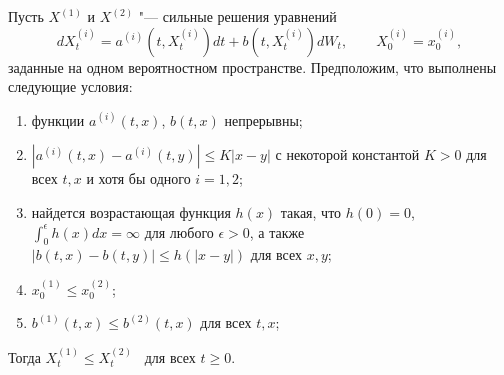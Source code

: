 \begin{lemma}
Пусть $X^{(1)}$ и $X^{(2)}$ "--- сильные решения уравнений
\[
d X_t^{(i)} = a^{(i)}(t, X_t^{(i)}) dt + b(t,X_t^{(i)}) d W_t, \qquad X_0^{(i)} = x_0^{(i)},
\]
заданные на одном вероятностном пространстве.
Предположим, что выполнены следующие условия:
\begin{enumerate}
\item функции $a^{(i)}(t,x)$, $b(t,x)$ непрерывны;
\item $|a^{(i)}(t,x) - a^{(i)}(t,y)| \le K|x-y|$ с некоторой константой $K>0$ для всех $t,x$ и хотя бы одного $i=1,2$;
\item найдется возрастающая функция $h(x)$ такая, что $h(0) = 0$, $\int_0^\epsilon h(x) dx = \infty$ для любого $\epsilon>0$, а также $|b(t,x) - b(t,y)| \le h(|x-y|)$ для всех $x,y$;
\item $x_0^{(1)} \le x_0^{(2)}$;
\item $b^{(1)}(t,x) \le b^{(2)}(t,x)$ для всех $t,x$;
\end{enumerate}
Тогда $X_t^{(1)} \le X_t^{(2)}$ \as\ для всех $t\ge 0$.
\end{lemma}

